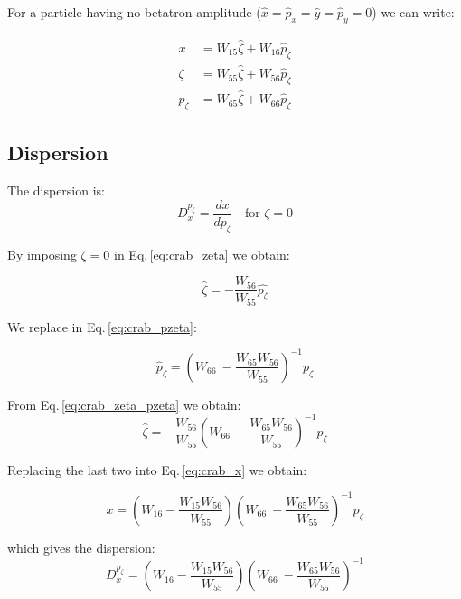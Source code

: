 For a particle having no betatron amplitude ($\hat{x} = \hat{p}_x =\hat{y} =\hat{p}_y=0$) we can write:

\begin{align}
x &= W_{15}\hat{\zeta} + W_{16}\hat{p}_\zeta \label{eq:crab_x}\\
\zeta &= W_{55}\hat{\zeta} + W_{56}\hat{p}_\zeta \label{eq:crab_zeta}\\
p_\zeta &= W_{65}\hat{\zeta} + W_{66}\hat{p}_\zeta \label{eq:crab_pzeta}
\end{align}


\subsection{Dispersion}
The dispersion is:
\begin{equation}
D_{x}^{p_\zeta} = \frac{dx}{d p_\zeta} \quad \text{for } \zeta=0
\end{equation}

By imposing $\zeta = 0$ in Eq.\,\ref{eq:crab_zeta} we obtain:

\begin{equation}
\hat{\zeta} = - \frac{W_{56}}{W_{55}}\hat{p_\zeta}
\label{eq:crab_zeta_pzeta}
\end{equation}

We replace in Eq.\,\ref{eq:crab_pzeta}:

\begin{equation}
  \hat{p}_\zeta = \left( W_{66}\ -  \frac{W_{65}W_{56}}{W_{55}} \right)^{-1}p_\zeta
\end{equation}

From Eq.\,\ref{eq:crab_zeta_pzeta} we obtain:
\begin{equation}
\hat{\zeta} = - \frac{W_{56}}{W_{55}}\left( W_{66}\ -  \frac{W_{65}W_{56}}{W_{55}} \right)^{-1} p_\zeta
\end{equation}

Replacing the last two into Eq.\,\ref{eq:crab_x} we obtain:

\begin{equation}
x = \left(W_{16} -\frac{W_{15}W_{56}}{W_{55}}\right)\left( W_{66}\ -  \frac{W_{65}W_{56}}{W_{55}} \right)^{-1} p_\zeta
\end{equation}

which gives the dispersion:
\begin{equation}
D_{x}^{p_\zeta} = \left(W_{16} -\frac{W_{15}W_{56}}{W_{55}}\right)\left( W_{66}\ -  \frac{W_{65}W_{56}}{W_{55}} \right)^{-1}
\end{equation}

